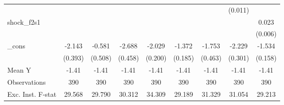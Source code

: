 {\begin{tabular}{l*{8}{c}}
            &                     &                     &                     &                     &                     &                     &     (0.011)         &                     \\
\addlinespace
shock\_f2s1  &                     &                     &                     &                     &                     &                     &                     &       0.023\sym{***}\\
            &                     &                     &                     &                     &                     &                     &                     &     (0.006)         \\
\addlinespace
\_cons      &      -2.143\sym{***}&      -0.581         &      -2.688\sym{***}&      -2.029\sym{***}&      -1.372\sym{***}&      -1.753\sym{***}&      -2.229\sym{***}&      -1.534\sym{***}\\
            &     (0.393)         &     (0.508)         &     (0.458)         &     (0.200)         &     (0.185)         &     (0.463)         &     (0.301)         &     (0.158)         \\
\midrule
Mean Y      &       -1.41         &       -1.41         &       -1.41         &       -1.41         &       -1.41         &       -1.41         &       -1.41         &       -1.41         \\
Observations&         390         &         390         &         390         &         390         &         390         &         390         &         390         &         390         \\
Exc. Inst. F-stat&      29.568         &      29.790         &      30.312         &      34.309         &      29.189         &      31.329         &      31.054         &      29.213         \\
\bottomrule
\end{tabular}
}
